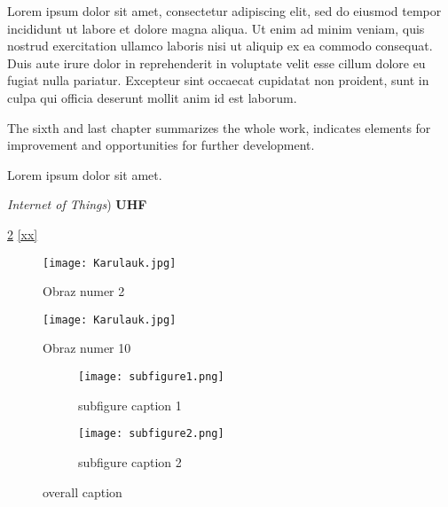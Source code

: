 \par Lorem ipsum dolor sit amet, consectetur adipiscing elit, sed do eiusmod tempor incididunt ut labore et dolore magna aliqua. Ut enim ad minim veniam, quis nostrud exercitation ullamco laboris nisi ut aliquip ex ea commodo consequat. Duis aute irure dolor in reprehenderit in voluptate velit esse cillum dolore eu fugiat nulla pariatur. Excepteur sint occaecat cupidatat non proident, sunt in culpa qui officia deserunt mollit anim id est laborum.
\par The sixth and last chapter summarizes the whole work, indicates elements for improvement and opportunities for further development.
\newline
\newline %
\par Lorem ipsum dolor sit amet.

\textit{Internet of Things}) %
\textbf{UHF} %

\cite{bibelment} %
\ref{figure10} %
\eqref{xx} %


\begin{figure}[H]
  \centering
  \texttt{[image: Karulauk.jpg]}
  \caption{Obraz numer 2}
  \label{figure:example1}
\end{figure}

\begin{figure}[H]
  \centering
  \texttt{[image: Karulauk.jpg]}
  \caption{Obraz numer 10}
  \label{figure10}
\end{figure}


\begin{figure}[H]
\centering
    \begin{subfigure}[H]{0.495\textwidth}
        \texttt{[image: subfigure1.png]}
        \caption{subfigure caption 1}
        \label{fig:subfig1}
    \end{subfigure}
        \begin{subfigure}[H]{0.495\textwidth}
        \texttt{[image: subfigure2.png]}
        \caption{subfigure caption 2}
        \label{fig:subfig2}
    \end{subfigure}
\caption{overall caption}
\label{fig}
\end{figure}


